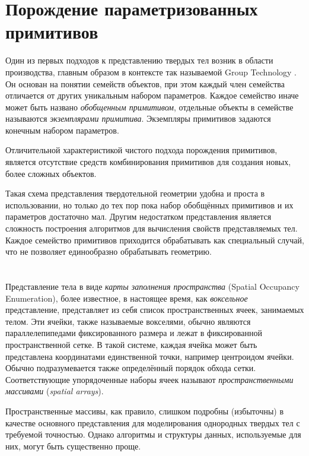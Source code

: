\section{Порождение параметризованных примитивов} \label{sect_primitive_instatiation}

Один из первых подходов к представлению твердых тел возник в области производства, главным образом в контексте так называемой Group Technology \cite{Gall73}. Он основан на понятии семейств объектов, при этом каждый член семейства отличается от других уникальным набором параметров. Каждое семейство иначе может быть названо \textit{обобщенным примитивом}, отдельные объекты в семействе называются \textit{экземплярами примитива}. Экземпляры примитивов задаются конечным набором параметров.

Отличительной характеристикой чистого подхода порождения примитивов, является отсутствие средств комбинирования примитивов для создания новых, более сложных объектов.

Такая схема представления твердотельной геометрии удобна и проста в использовании, но только до тех пор пока набор обобщённых примитивов и их параметров достаточно мал. Другим недостатком представления является сложность построения алгоритмов для вычисления свойств представляемых тел. Каждое семейство примитивов приходится обрабатывать как специальный случай, что не позволяет единообразно обрабатывать геометрию.

\section{} \label{sect_spatial_occupancy_enum}

Представление тела в виде \textit{карты заполнения пространства} (Spatial Occupancy Enumeration), более известное, в настоящее время, как \textit{воксельное} представление, представляет из себя список пространственных ячеек, занимаемых телом. Эти ячейки, также называемые вокселями, обычно являются параллелепипедами фиксированного размера и лежат в фиксированной пространственной сетке. В такой системе, каждая ячейка может быть представлена координатами единственной точки, например центроидом ячейки. Обычно подразумевается также определённый порядок обхода сетки. Соответствующие упорядоченные наборы ячеек называют \textit{пространственными массивами} (\textit{spatial arrays}).

Пространственные массивы, как правило, слишком подробны (избыточны) в качестве основного представления для моделирования однородных твердых тел с требуемой точностью. Однако алгоритмы и структуры данных, используемые для них, могут быть существенно проще.

